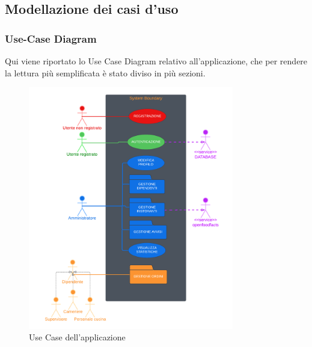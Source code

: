 \subsection{Modellazione dei casi d'uso}
    \subsubsection{Use-Case Diagram}
        \begin{flushleft}
            Qui viene riportato lo Use Case Diagram relativo all'applicazione, che per rendere la lettura più semplificata 
            è stato diviso in più sezioni.
        \end{flushleft}
        
        \begin{figure}[H]
            \centering
            \includegraphics[width=0.8\textwidth]{assets/diagrammi/Use-Case/Use-Case Generale.png}
            \caption{Use Case dell'applicazione}
            \label{fig:ucdGenerale}
        \end{figure}
        
